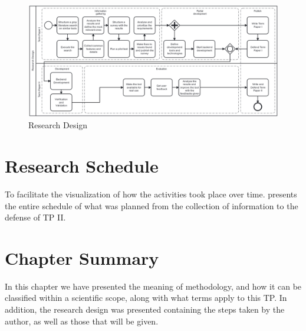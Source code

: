 \begin{figure}[htb]
  \caption{Research Design}\label{fig:research-design}
  \begin{center}
    \includegraphics[width=16cm]{img/2-research-diagram.png}
  \end{center}
\end{figure}

\section{Research Schedule}\label{sec:met-schedule}


To facilitate the visualization of how the activities took place over time. 
 presents the entire schedule of what was planned from the collection of information to the defense of \acl{TP} II.




\section{Chapter Summary}\label{sec:met-summary}


In this chapter we have presented the meaning of methodology, and how it can be classified within a scientific scope, along with what terms apply to this \ac{TP}. 
In addition, the research design was presented containing the steps taken by the author, as well as those that will be given.


